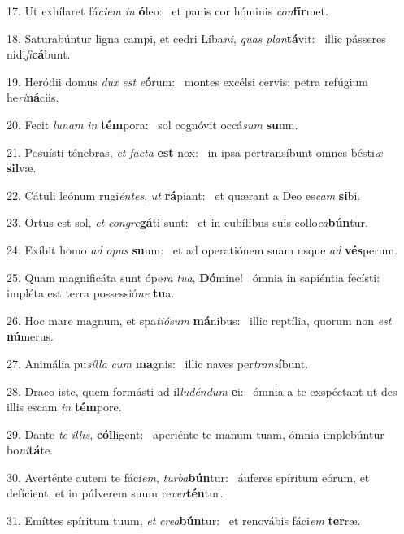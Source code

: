 17. Ut exhílaret fá\textit{ci}\textit{em} \textit{in} \textbf{ó}leo: \ast\  et panis cor hóminis \textit{con}\textbf{fír}met.\

18. Saturabúntur ligna campi, et cedri Líba\textit{ni}, \textit{quas} \textit{plan}\textbf{tá}vit: \ast\  illic pásseres nidi\textit{fi}\textbf{cá}bunt.\

19. Heródii domus \textit{dux} \textit{est} \textit{e}\textbf{ó}rum: \ast\  montes excélsi cervis: petra refúgium he\textit{ri}\textbf{ná}ciis.\

20. Fecit \textit{lu}\textit{nam} \textit{in} \textbf{tém}pora: \ast\  sol cognóvit occá\textit{sum} \textbf{su}um.\

21. Posuísti ténebras, \textit{et} \textit{fac}\textit{ta} \textbf{est} nox: \ast\  in ipsa pertransíbunt omnes bésti\textit{æ} \textbf{sil}væ.\

22. Cátuli leónum rugi\textit{én}\textit{tes}, \textit{ut} \textbf{rá}piant: \ast\  et quærant a Deo es\textit{cam} \textbf{si}bi.\

23. Ortus est sol, \textit{et} \textit{con}\textit{gre}\textbf{gá}ti sunt: \ast\  et in cubílibus suis collo\textit{ca}\textbf{bún}tur.\

24. Exíbit homo \textit{ad} \textit{o}\textit{pus} \textbf{su}um: \ast\  et ad operatiónem suam usque \textit{ad} \textbf{vés}perum.\

25. Quam magnificáta sunt ópe\textit{ra} \textit{tu}\textit{a}, \textbf{Dó}mine! \ast\  ómnia in sapiéntia fecísti: impléta est terra possessió\textit{ne} \textbf{tu}a.\

26. Hoc mare magnum, et spa\textit{ti}\textit{ó}\textit{sum} \textbf{má}nibus: \ast\  illic reptília, quorum non \textit{est} \textbf{nú}merus.\

27. Animália pu\textit{síl}\textit{la} \textit{cum} \textbf{ma}gnis: \ast\  illic naves per\textit{trans}\textbf{í}bunt.\

28. Draco iste, quem formásti ad il\textit{lu}\textit{dén}\textit{dum} \textbf{e}i: \ast\  ómnia a te exspéctant ut des illis escam \textit{in} \textbf{tém}pore.\

29. Dante \textit{te} \textit{il}\textit{lis}, \textbf{cól}ligent: \ast\  aperiénte te manum tuam, ómnia implebúntur bo\textit{ni}\textbf{tá}te.\

30. Averténte autem te fáci\textit{em}, \textit{tur}\textit{ba}\textbf{bún}tur: \ast\  áuferes spíritum eórum, et defícient, et in púlverem suum re\textit{ver}\textbf{tén}tur.\

31. Emíttes spíritum tuum, \textit{et} \textit{cre}\textit{a}\textbf{bún}tur: \ast\  et renovábis fáci\textit{em} \textbf{ter}ræ.\

